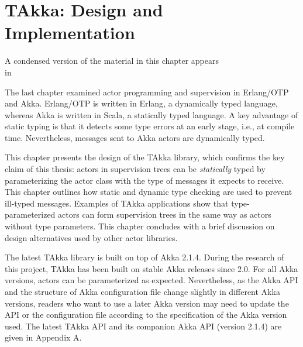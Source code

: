 \chapter{TAkka: Design and Implementation}
\label{takka_design}

\begin{center}
A condensed version of the material in this chapter appears \\ in~\citep[Section 3 and 4]{TAKKA_paper}
\end{center}
\vspace{12 pt}

The last chapter examined actor programming and supervision in Erlang/OTP and Akka. 
 Erlang/OTP is written in Erlang, a dynamically typed language, whereas Akka is 
written in Scala, a statically typed language. A key advantage of static typing 
is that it detects some type errors at an early stage, i.e., at compile time.  
Nevertheless, messages sent to Akka actors are dynamically typed. 

This chapter presents the design of the TAkka library, which confirms the key 
claim of this thesis: actors in supervision trees can be 
{\it statically} typed by parameterizing the actor class with the type of 
messages it expects to receive.  This chapter outlines how 
static and dynamic type checking are used to prevent ill-typed messages.  
Examples of TAkka applications show that type-parameterized actors can form 
supervision trees in the same way as actors without type parameters.  This 
chapter concludes with a brief discussion on design alternatives used by 
other actor libraries.

The latest TAkka library is built on top of Akka 2.1.4.  During the research 
of this project, TAkka has been built on stable Akka releases since 2.0.  For 
all Akka versions, actors can be parameterized as expected.  
Nevertheless, as the Akka API and the structure of Akka configuration file change 
slightly in different Akka versions, readers who want to use a later Akka 
version may need to update the API or the configuration file according to the 
specification of the Akka version used.  The latest TAkka API and its companion Akka
API (version 2.1.4) are given in Appendix A.


